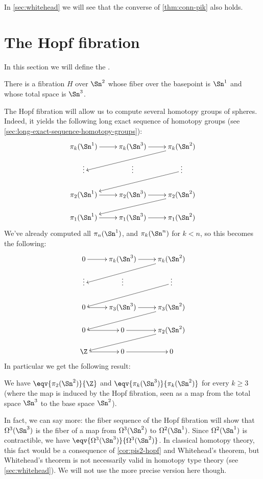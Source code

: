 In \cref{sec:whitehead} we will see that the converse of \cref{thm:conn-pik} also holds.

%
%

\section{The Hopf fibration}
\label{sec:hopf}

In this section we will define the .
%

\begin{thm}\label{thm:hopf-fibration}
There is a fibration $H$ over $\Sn ^2$ whose fiber over the basepoint is $\Sn ^1$ and
whose total space is $\Sn ^3$.
\end{thm}

The Hopf fibration will allow us to compute several homotopy groups of
spheres.
Indeed, it yields the following long exact sequence
of homotopy groups
(see
\cref{sec:long-exact-sequence-homotopy-groups}):
%
\[
\xymatrix@R=1.2pc{
  \pi_k(\Sn^1) \ar[r] & \pi_k(\Sn^3) \ar[r] & \pi_k(\Sn^2) \ar[lld] \\
  \vdots & \vdots & \vdots \ar[lld] \\
  \pi_2(\Sn^1) \ar[r] & \pi_2(\Sn^3) \ar[r] & \pi_2(\Sn^2) \ar[lld] \\
  \pi_1(\Sn^1) \ar[r] & \pi_1(\Sn^3) \ar[r] & \pi_1(\Sn^2)}
\]
%
We've already computed all $\pi_n(\Sn^1)$, and $\pi_k(\Sn^n)$ for $k<n$, so this
becomes the following:
%
\[
\xymatrix@R=1.2pc{
  0 \ar[r] & \pi_k(\Sn^3) \ar[r] & \pi_k(\Sn^2) \ar[lld] \\
  \vdots & \vdots & \vdots \ar[lld] \\
  0 \ar[r] & \pi_3(\Sn^3) \ar[r] & \pi_3(\Sn^2) \ar[lld] \\
  0 \ar[r] & 0 \ar[r] & \pi_2(\Sn^2) \ar[lld] \\
  \Z \ar[r] & 0 \ar[r] & 0}
\]
%
In particular we get the following result:

\begin{cor} \label{cor:pis2-hopf}
  We have $\eqv{\pi_2(\Sn^2)}{\Z}$ and $\eqv{\pi_k(\Sn^3)}{\pi_k(\Sn^2)}$ for
  every $k\ge3$ (where the map is induced by the Hopf fibration, seen as a map
  from the total space $\Sn^3$ to the base space $\Sn^2$).
\end{cor}

In fact, we can say more: the fiber sequence of the Hopf fibration will show that $\Omega^3(\Sn^3)$ is the fiber of a map from $\Omega^3(\Sn^2)$ to $\Omega^2(\Sn^1)$.
Since $\Omega^2(\Sn^1)$ is contractible, we have $\eqv{\Omega^3(\Sn^3)}{\Omega^3(\Sn^2)}$.
In classical homotopy theory, this fact would be a consequence of \cref{cor:pis2-hopf} and Whitehead's theorem, but Whitehead's theorem is not necessarily valid in homotopy type theory (see \cref{sec:whitehead}).
We will not use the more precise version here though.

